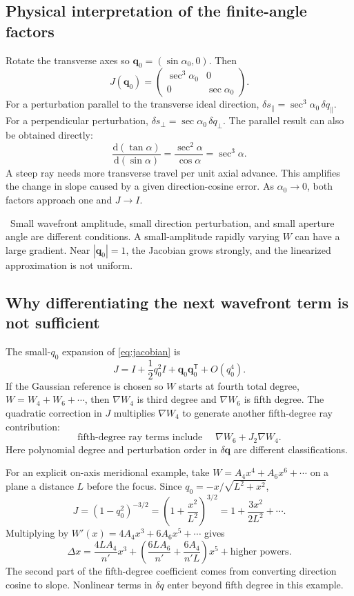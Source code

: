 \documentclass[11pt,a4paper]{article}
\numberwithin{equation}{section}
\newcommand{\dd}{\mathrm{d}}
\newcommand{\vct}[1]{\bm{#1}}
\newcommand{\caution}[1]{\par\smallskip\noindent{\color{warm}\textbf{Keep distinct.}}\ #1\par\smallskip}
\begin{document}
\subsection{Physical interpretation of the finite-angle factors}
Rotate the transverse axes so $\vct q_0=(\sin\alpha_0,0)$.
Then
\[
 J(\vct q_0)=
 \begin{pmatrix}
 \sec^3\alpha_0&0\\0&\sec\alpha_0
 \end{pmatrix}.
\]
For a perturbation parallel to the transverse ideal direction,
$\delta s_\parallel=\sec^3\alpha_0\,\delta q_\parallel$.
For a perpendicular perturbation,
$\delta s_\perp=\sec\alpha_0\,\delta q_\perp$.
The parallel result can also be obtained directly:
\[
 \frac{\dd(\tan\alpha)}{\dd(\sin\alpha)}
 =\frac{\sec^2\alpha}{\cos\alpha}=\sec^3\alpha.
\]
A steep ray needs more transverse travel per unit axial advance. This
amplifies the change in slope caused by a given direction-cosine error.
As $\alpha_0\to0$, both factors approach one and $J\to I$.

\caution{Small wavefront amplitude, small direction perturbation, and
small aperture angle are different conditions. A small-amplitude rapidly
varying $W$ can have a large gradient. Near $|\vct q_0|=1$, the Jacobian
grows strongly, and the linearized approximation is not uniform.}

\subsection{Why differentiating the next wavefront term is not sufficient}
The small-$q_0$ expansion of \eqref{eq:jacobian} is
\[
 J=I+\frac12q_0^2I+\vct q_0\vct q_0^{\mathsf T}+O(q_0^4).
\]
If the Gaussian reference is chosen so $W$ starts at fourth total degree,
$W=W_4+W_6+\cdots$, then $\nabla W_4$ is third degree and
$\nabla W_6$ is fifth degree. The quadratic correction in $J$ multiplies
$\nabla W_4$ to generate another fifth-degree ray contribution:
\[
 \text{fifth-degree ray terms include }\quad
 \nabla W_6+J_2\nabla W_4.
\]
Here polynomial degree and perturbation order in $\delta\vct q$ are
different classifications.

For an explicit on-axis meridional example, take
$W=A_4x^4+A_6x^6+\cdots$ on a plane a distance $L$ before the focus.
Since $q_0=-x/\sqrt{L^2+x^2}$,
\[
 J=(1-q_0^2)^{-3/2}
 =\left(1+\frac{x^2}{L^2}\right)^{3/2}
 =1+\frac{3x^2}{2L^2}+\cdots.
\]
Multiplying by $W'(x)=4A_4x^3+6A_6x^5+\cdots$ gives
\begin{equation}
 \Delta x
 =\frac{4LA_4}{n'}x^3+
 \left(\frac{6LA_6}{n'}+\frac{6A_4}{n'L}\right)x^5
 +\text{higher powers}.
\end{equation}
The second part of the fifth-degree coefficient comes from converting
direction cosine to slope. Nonlinear terms in $\delta q$ enter beyond
fifth degree in this example.
\end{document}
